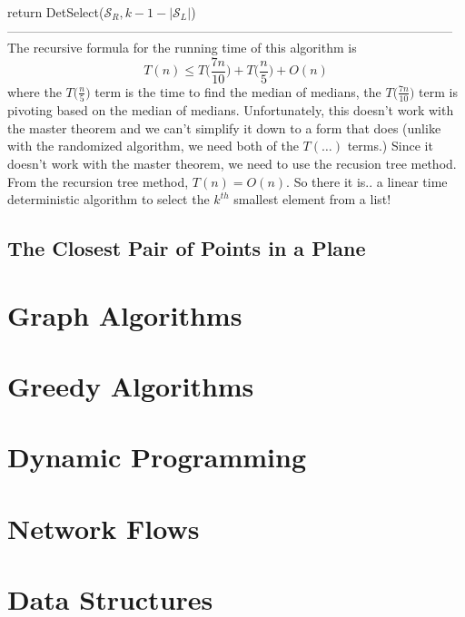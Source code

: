 \documentclass{article}
\newcommand{\ds}{\displaystyle}
\begin{document}
	\hspace*{21mm} return DetSelect($\mathcal{S}_R, k-1-|\mathcal{S}_L|$)\\
---------------------------------------------------------------------------------------------------------\\
The recursive formula for the running time of this algorithm is
\[T(n) \leq T\bigg(\frac{7n}{10}\bigg) + T\bigg(\frac{n}{5}\bigg) + O(n)\]
where the $\ds T\bigg(\frac{n}{5}\bigg)$ term is the time to find the median of medians, the $\ds T\bigg(\frac{7n}{10}\bigg)$ term is pivoting based on the median of medians. Unfortunately, this doesn't work with the master theorem and we can't simplify it down to a form that does (unlike with the randomized algorithm, we need both of the $T(\dots)$ terms.) Since it doesn't work with the master theorem, we need to use the recusion tree method. From the recursion tree method, $T(n) = O(n)$. So there it is.. a linear time deterministic algorithm to select the $k^{th}$ smallest element from a list!
\subsection{The Closest Pair of Points in a Plane}
\newpage

\section{Graph Algorithms}
\newpage


\section{Greedy Algorithms}
\newpage


\section{Dynamic Programming}
\newpage


\section{Network Flows}
\newpage


\section{Data Structures}
\newpage

\end{document}
